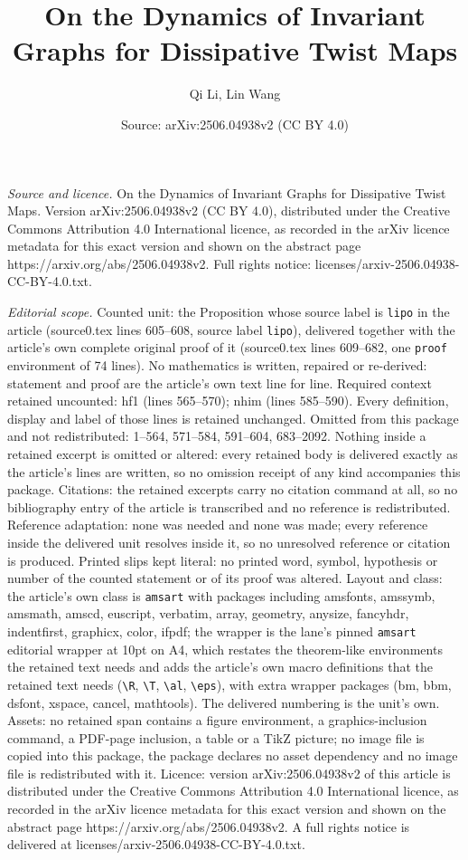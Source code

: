 \documentclass[10pt,a4paper]{amsart}
\title[On the Dynamics of Invariant Graphs for Dissipative Twist Ma]{On the Dynamics of Invariant Graphs for Dissipative Twist Maps}
\author{Qi Li, Lin Wang}
\date{Source: arXiv:2506.04938v2 (CC BY 4.0)}
\begin{document}
\maketitle

\noindent\emph{Source and licence.} On the Dynamics of Invariant Graphs for Dissipative Twist Maps. Version arXiv:2506.04938v2 (CC BY 4.0), distributed under the Creative Commons Attribution 4.0 International licence, as recorded in the arXiv licence metadata for this exact version and shown on the abstract page https://arxiv.org/abs/2506.04938v2. Full rights notice: licenses/arxiv-2506.04938-CC-BY-4.0.txt.\par\smallskip

\noindent\textit{Editorial scope.} Counted unit: the Proposition whose source label is \texttt{lipo} in the article (source0.tex lines 605--608, source label \texttt{lipo}), delivered together with the article's own complete original proof of it (source0.tex lines 609--682, one \texttt{proof} environment of 74 lines). No mathematics is written, repaired or re-derived: statement and proof are the article's own text line for line. Required context retained uncounted: hf1 (lines 565--570); nhim (lines 585--590). Every definition, display and label of those lines is retained unchanged. Omitted from this package and not redistributed: 1--564, 571--584, 591--604, 683--2092. Nothing inside a retained excerpt is omitted or altered: every retained body is delivered exactly as the article's lines are written, so no omission receipt of any kind accompanies this package. Citations: the retained excerpts carry no citation command at all, so no bibliography entry of the article is transcribed and no reference is redistributed. Reference adaptation: none was needed and none was made; every reference inside the delivered unit resolves inside it, so no unresolved reference or citation is produced. Printed slips kept literal: no printed word, symbol, hypothesis or number of the counted statement or of its proof was altered. Layout and class: the article's own class is \texttt{amsart} with packages including amsfonts, amssymb, amsmath, amscd, euscript, verbatim, array, geometry, anysize, fancyhdr, indentfirst, graphicx, color, ifpdf; the wrapper is the lane's pinned \texttt{amsart} editorial wrapper at 10pt on A4, which restates the theorem-like environments the retained text needs and adds the article's own macro definitions that the retained text needs (\texttt{\textbackslash R}, \texttt{\textbackslash T}, \texttt{\textbackslash al}, \texttt{\textbackslash eps}), with extra wrapper packages (bm, bbm, dsfont, xspace, cancel, mathtools). The delivered numbering is the unit's own. Assets: no retained span contains a figure environment, a graphics-inclusion command, a PDF-page inclusion, a table or a TikZ picture; no image file is copied into this package, the package declares no asset dependency and no image file is redistributed with it. Licence: version arXiv:2506.04938v2 of this article is distributed under the Creative Commons Attribution 4.0 International licence, as recorded in the arXiv licence metadata for this exact version and shown on the abstract page https://arxiv.org/abs/2506.04938v2. A full rights notice is delivered at licenses/arxiv-2506.04938-CC-BY-4.0.txt. 
\end{document}
